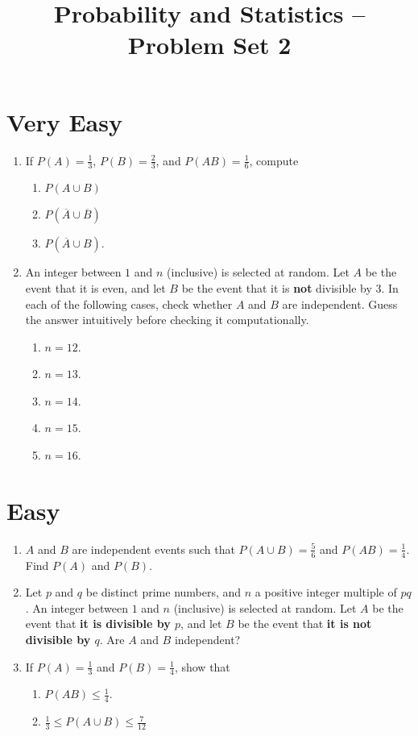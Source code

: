 \documentclass[svgnames]{amsart}
\title[]{Probability and Statistics -- Problem Set 2}
\begin{document}
\maketitle


\section{Very Easy}
\begin{enumerate}
\item If $P(A) = \frac 1 3$, $P(B) = \frac 2 3$, and $P(AB) = \frac 1 6$, compute
\begin{enumerate}
	\item $P(A \cup B)$
	\item $P(\overline A \cup \overline B)$
	\item $P(\overline A \cup B)$.
\end{enumerate}

\item An integer between $1$ and $n$ (inclusive) is selected at random. Let $A$ be the event that it is even, and let $B$ be the event that it is \textbf{not} divisible by $3$. In each of the following cases, check whether $A$ and $B$ are independent. Guess the answer intuitively before checking it computationally.
\begin{enumerate}
	\item $n = 12$.
	\item $n = 13$.
	\item $n = 14$.
	\item $n = 15$.
	\item $n = 16$.
\end{enumerate}
\end{enumerate} %

\section{Easy}
\begin{enumerate}
\item $A$ and $B$ are independent events such that $P(A \cup B) = \frac 5 6$ and $P(AB) = \frac 1 4$. Find $P(A)$ and $P(B)$.

\item Let $p$ and $q$ be distinct prime numbers, and $n$ a positive integer multiple of $pq$. An integer between $1$ and $n$ (inclusive) is selected at random. Let $A$ be the event that \textbf{it is divisible by $p$}, and let $B$ be the event that \textbf{it is not divisible by $q$}. Are $A$ and $B$ independent?

\item If $P(A) = \frac 1 3$ and $P(B) = \frac 1 4$, show that
\begin{enumerate}
	\item $P(AB) \le \frac 1 4$.
	\item $\frac 1 3 \le P(A \cup B) \le \frac 7 {12}$
\end{enumerate}
\end{enumerate} %
\end{document}
